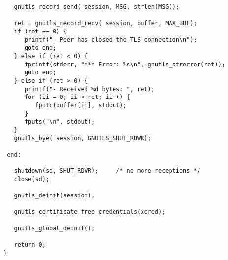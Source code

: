 \begin{verbatim}
   gnutls_record_send( session, MSG, strlen(MSG));

   ret = gnutls_record_recv( session, buffer, MAX_BUF);
   if (ret == 0) {
      printf("- Peer has closed the TLS connection\n");
      goto end;
   } else if (ret < 0) {
      fprintf(stderr, "*** Error: %s\n", gnutls_strerror(ret));
      goto end;
   } else if (ret > 0) {
      printf("- Received %d bytes: ", ret);
      for (ii = 0; ii < ret; ii++) {
         fputc(buffer[ii], stdout);
      }
      fputs("\n", stdout);
   }
   gnutls_bye( session, GNUTLS_SHUT_RDWR);

 end:

   shutdown(sd, SHUT_RDWR);     /* no more receptions */
   close(sd);

   gnutls_deinit(session);

   gnutls_certificate_free_credentials(xcred);

   gnutls_global_deinit();

   return 0;
}

\end{verbatim}
